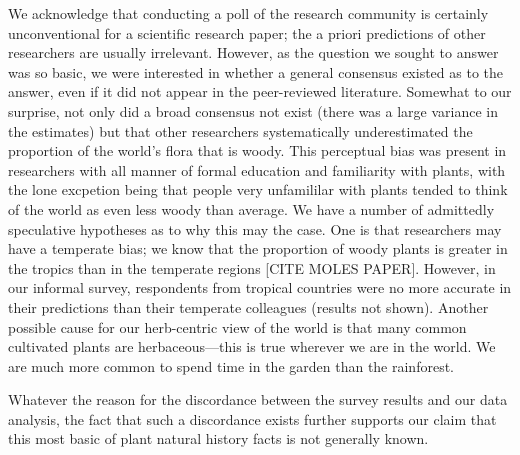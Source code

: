 \documentclass[12pt]{article}
\begin{document}
We acknowledge that conducting a poll of the research community is certainly unconventional for a scientific research paper; the a priori predictions of other researchers are usually irrelevant. However, as the question we sought to answer was so basic, we were interested in whether a general consensus existed as to the answer, even if it did not appear in the peer-reviewed literature. Somewhat to our surprise, not only did a broad consensus not exist (there was a large variance in the estimates) but that other researchers systematically underestimated the proportion of the world's flora that is woody. This perceptual bias was present in researchers with all manner of formal education and familiarity with plants, with the lone excpetion being that people very unfamililar with plants tended to think of the world as even less woody than average. We have a number of admittedly speculative hypotheses as to why this may the case. One is that researchers may have a temperate bias; we know that the proportion of woody plants is greater in the tropics than in the temperate regions [CITE MOLES PAPER]. However, in our informal survey, respondents from tropical countries were no more accurate in their predictions than their temperate colleagues (results not shown). Another possible cause for our herb-centric view of the world is that many common cultivated plants are herbaceous---this is true wherever we are in the world. We are much more common to spend time in the garden than the rainforest. 

Whatever the reason for the discordance between the survey results and our data analysis, the fact that such a discordance exists further supports our claim that this most basic of plant natural history facts is not generally known.   





\end{document}
